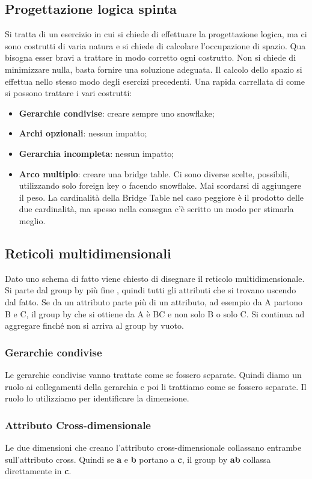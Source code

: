 \subsection{Progettazione logica spinta}
Si tratta di un esercizio in cui si chiede di effettuare la progettazione logica, ma ci sono costrutti di varia natura e si chiede di calcolare l'occupazione di spazio. Qua bisogna esser bravi a trattare in modo corretto ogni costrutto. Non si chiede di minimizzare nulla, basta fornire una soluzione adeguata. Il calcolo dello spazio si effettua nello stesso modo degli esercizi precedenti. Una rapida carrellata di come si possono trattare i vari costrutti:
\begin{itemize}
	\item \textbf{Gerarchie condivise}: creare sempre uno snowflake;
	\item \textbf{Archi opzionali}: nessun impatto;
	\item \textbf{Gerarchia incompleta}: nessun impatto;
	\item \textbf{Arco multiplo}: creare una bridge table. Ci sono diverse scelte, possibili, utilizzando solo foreign key o facendo snowflake. Mai scordarsi di aggiungere il peso. La cardinalità della Bridge Table nel caso peggiore è il prodotto delle due cardinalità, ma spesso nella consegna c'è scritto un modo per stimarla meglio.
\end{itemize}
\subsection{Reticoli multidimensionali}
Dato uno schema di fatto viene chiesto di disegnare il reticolo multidimensionale. Si parte dal group by più fine , quindi tutti gli attributi che si trovano uscendo dal fatto. Se da un attributo parte più di un attributo, ad esempio da A partono B e C, il group by che si ottiene da A è BC e non solo B o solo C. Si continua ad aggregare finché non si arriva al group by vuoto.
\subsubsection{Gerarchie condivise}
Le gerarchie condivise vanno trattate come se fossero separate. Quindi diamo un ruolo ai collegamenti della gerarchia e poi li trattiamo come se fossero separate. Il ruolo lo utilizziamo per identificare la dimensione.
\subsubsection{Attributo Cross-dimensionale}
Le due dimensioni che creano l'attributo cross-dimensionale collassano entrambe sull'attributo cross. Quindi  se \textbf{a} e \textbf{b} portano a  \textbf{c}, il group by {\textbf{ab}} collassa direttamente in {\textbf{c}}.
